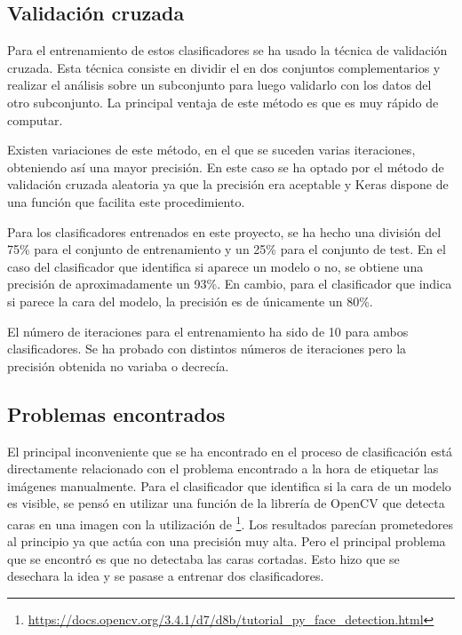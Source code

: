 \subsection{Validación cruzada}
Para el entrenamiento de estos clasificadores se ha usado la técnica de validación cruzada. Esta técnica consiste en dividir el  en dos conjuntos complementarios y realizar el análisis sobre un subconjunto para luego validarlo con los datos del otro subconjunto. La principal ventaja de este método es que es muy rápido de computar.

Existen variaciones de este método, en el que se suceden varias iteraciones, obteniendo así una mayor precisión. En este caso se ha optado por el método de validación cruzada aleatoria ya que la precisión era aceptable y Keras dispone de una función que facilita este procedimiento. \cite{wiki:cruzada}


Para los clasificadores entrenados en este proyecto, se ha hecho una división del 75\% para el conjunto de entrenamiento y un 25\% para el conjunto de test. En el caso del clasificador que identifica si aparece un modelo o no, se obtiene una precisión de aproximadamente un 93\%. En cambio, para el clasificador que indica si parece la cara del modelo, la precisión es de únicamente un 80\%.


El número de iteraciones para el entrenamiento ha sido de 10 para ambos clasificadores. Se ha probado con distintos números de iteraciones pero la precisión obtenida no variaba o decrecía.

\subsection{Problemas encontrados}

El principal inconveniente que se ha encontrado en el proceso de clasificación está directamente relacionado con el problema encontrado a la hora de etiquetar las imágenes manualmente. Para el clasificador que identifica si la cara de un modelo es visible, se pensó en utilizar una función de la librería de OpenCV que detecta caras en una imagen con la utilización de \footnote{\url{https://docs.opencv.org/3.4.1/d7/d8b/tutorial_py_face_detection.html}}. Los resultados parecían prometedores al principio ya que actúa con una precisión muy alta. Pero el principal problema que se encontró es que no detectaba las caras cortadas. Esto hizo que se desechara la idea y se pasase a entrenar dos clasificadores.

